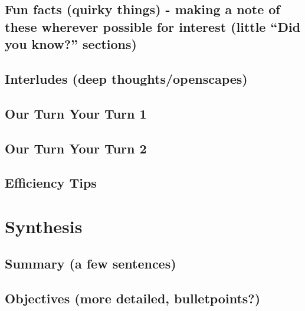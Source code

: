 \documentclass[]{book}
\begin{document}
\hypertarget{fun-facts-quirky-things---making-a-note-of-these-wherever-possible-for-interest-little-did-you-know-sections-2}{%
\section{Fun facts (quirky things) - making a note of these wherever possible for interest (little ``Did you know?'' sections)}\label{fun-facts-quirky-things---making-a-note-of-these-wherever-possible-for-interest-little-did-you-know-sections-2}}

\hypertarget{interludes-deep-thoughtsopenscapes-5}{%
\section{Interludes (deep thoughts/openscapes)}\label{interludes-deep-thoughtsopenscapes-5}}

\hypertarget{our-turn-your-turn-1-2}{%
\section{Our Turn Your Turn 1}\label{our-turn-your-turn-1-2}}

\hypertarget{our-turn-your-turn-2-3}{%
\section{Our Turn Your Turn 2}\label{our-turn-your-turn-2-3}}

\hypertarget{efficiency-tips-6}{%
\section{Efficiency Tips}\label{efficiency-tips-6}}

\hypertarget{synthesis}{%
\chapter{Synthesis}\label{synthesis}}

\hypertarget{summary-a-few-sentences-5}{%
\section{Summary (a few sentences)}\label{summary-a-few-sentences-5}}

\hypertarget{objectives-more-detailed-bulletpoints-5}{%
\section{Objectives (more detailed, bulletpoints?)}\label{objectives-more-detailed-bulletpoints-5}}
\end{document}
